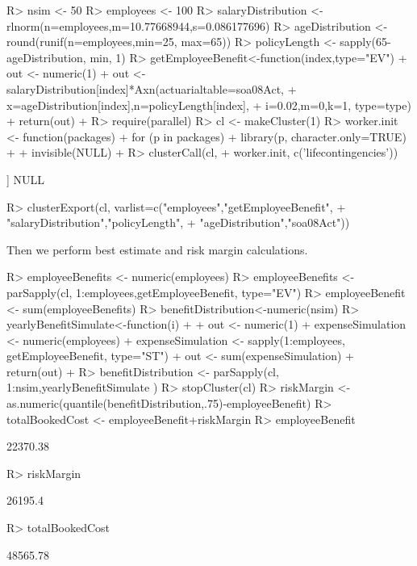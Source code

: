 \documentclass[nojss]{jss}
\begin{document}
\begin{Schunk}
\begin{Sinput}
R> nsim <- 50
R> employees <- 100
R> salaryDistribution <- rlnorm(n=employees,m=10.77668944,s=0.086177696)
R> ageDistribution <- round(runif(n=employees,min=25, max=65))
R> policyLength <- sapply(65-ageDistribution, min, 1)
R> getEmployeeBenefit<-function(index,type="EV") {
+  	out <- numeric(1)
+  	out <- salaryDistribution[index]*Axn(actuarialtable=soa08Act, 
+  			x=ageDistribution[index],n=policyLength[index], 
+  			i=0.02,m=0,k=1, type=type)
+  	return(out)
+  }
R> require(parallel)
R> cl <- makeCluster(1) 
R> worker.init <- function(packages) {
+  	for (p in packages) {
+  		library(p, character.only=TRUE)
+  	}
+  	invisible(NULL)
+  }
R> clusterCall(cl, 
+  		worker.init, c('lifecontingencies'))
\end{Sinput}
\begin{Soutput}
[[1]]
NULL
\end{Soutput}
\begin{Sinput}
R> clusterExport(cl, varlist=c("employees","getEmployeeBenefit",
+  				"salaryDistribution","policyLength",
+  				"ageDistribution","soa08Act"))
\end{Sinput}
\end{Schunk}
Then we perform best estimate and risk margin calculations.

\begin{Schunk}
\begin{Sinput}
R> employeeBenefits <- numeric(employees)
R> employeeBenefits <- parSapply(cl, 1:employees,getEmployeeBenefit, type="EV")
R> employeeBenefit <- sum(employeeBenefits)
R> benefitDistribution<-numeric(nsim)
R> yearlyBenefitSimulate<-function(i)
+  {
+  	out <- numeric(1)
+  	expenseSimulation <- numeric(employees)
+  	expenseSimulation <- sapply(1:employees, getEmployeeBenefit, type="ST")
+  	out <- sum(expenseSimulation)
+  	return(out)
+  }
R> benefitDistribution <- parSapply(cl, 1:nsim,yearlyBenefitSimulate )
R> stopCluster(cl)
R> riskMargin <- as.numeric(quantile(benefitDistribution,.75)-employeeBenefit)
R> totalBookedCost <- employeeBenefit+riskMargin
R> employeeBenefit
\end{Sinput}
\begin{Soutput}
[1] 22370.38
\end{Soutput}
\begin{Sinput}
R> riskMargin
\end{Sinput}
\begin{Soutput}
[1] 26195.4
\end{Soutput}
\begin{Sinput}
R> totalBookedCost
\end{Sinput}
\begin{Soutput}
[1] 48565.78
\end{Soutput}
\end{Schunk}
\end{document}
